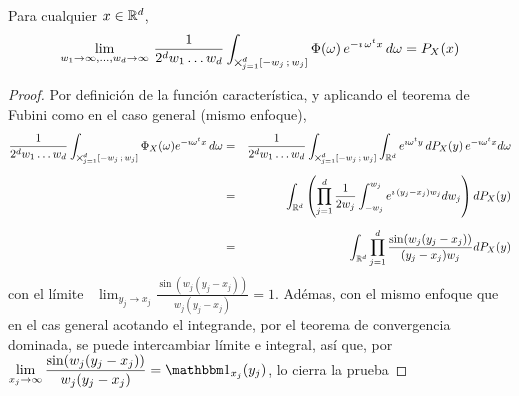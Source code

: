{\begin{teorema}\label{Teo:MP:InversionMasa}
%
  Para cualquier $x \in \mathbb{R}^d$,
  \[
  \lim_{w_1  \to  \infty,\ldots,w_d \to  \infty} \,  \frac{1}{2^d  w_1 \ldots  w_d}
  \int_{\operatorname*{\bigtimes}_{j=1}^d [-w_j \, ; \, w_j]}  \Phi(\omega) \, e^{- \imath \, \omega^t x}
  \, d\omega = P_X(x)
  \]
\end{teorema}
%
\begin{proof}
  Por definici\'on de  la funci\'on caracter\'istica, y aplicando  el teorema de
  Fubini como en el caso general (mismo enfoque),
  \begin{eqnarray*}
  \frac{1}{2^d w_1 \ldots w_d} \int_{\operatorname*{\bigtimes}_{j=1}^d [-w_j \, ; \, w_j]}
  \Phi_X(\omega) e^{- \imath \omega^t x} \, d\omega & = & \frac{1}{2^d w_1 \ldots
  w_d} \int_{\operatorname*{\bigtimes}_{j=1}^d [-w_j \, ; \, w_j]} \int_{\mathbb{R}^d} e^{\imath \omega^t y}
  \, dP_X(y) \, e^{- \imath \omega^t x} d\omega\\[2mm]
  & = & \int_{\mathbb{R}^d} \left( \prod_{j=1}^d \frac{1}{2 w_j} \int_{-w_j}^{w_j}
  e^{\imath \, (y_j - x_j) w_j} dw_j \right) dP_X(y)\\[2mm]
  & = & \int_{\mathbb{R}^d} \prod_{j=1}^d \frac{\sin(w_j (y_j-x_j))}{(y_j-x_j) w_j}  dP_X(y)
  \end{eqnarray*}
  con   el  l\'imite   \  $\displaystyle   \lim_{y_j  \to   x_j}  \frac{\sin(w_j
    (y_j-x_j))}{w_j( y_j-x_j)}  = 1$. Ad\'emas, con  el mismo enfoque  que en el
  cas general acotando  el integrande, por el teorema  de convergencia dominada,
  se  puede intercambiar  l\'imite  e integral,  as\'i  que, por  $\displaystyle
  \lim_{x_j   \to   \infty}    \frac{\sin(w_j   (y_j-x_j))}{w_j(   y_j-x_j)}   =
  \un_{x_j}(y_j)$, lo cierra la prueba
\end{proof}

}
